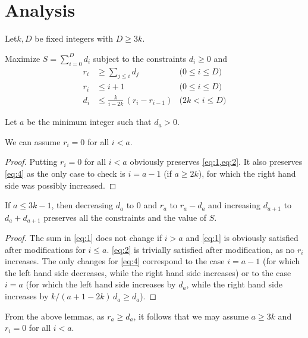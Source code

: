 \section{Analysis}

Let$k,D$ be fixed integers with $D\ge 3k$.

\begin{problem}
Maximize $S=\sum_{i=0}^D d_i$ subject to the constraints $d_i\ge 0$ and 
\begin{align}
	r_i &\ge \sum_{j\le i} d_j&\text{($0\le i\le D$)}\label{eq:1}\\
	r_i &\le	i+1&\text{($0\le i\le D$)}\label{eq:2}\\
	d_{i}&\leq \frac{k}{i-2k}\,(r_{i}-r_{i-1})&\text{($2k< i\le D$)}\label{eq:4}
\end{align}
\end{problem}

Let $a$ be the minimum integer such that $d_a>0$.

\begin{lemma}
	We can assume $r_i=0$ for all $i<a$.
\end{lemma}
\begin{proof}
	Putting $r_i=0$ for all $i<a$ obviously preserves \cref{eq:1,eq:2}. It also preserves \cref{eq:4} as the only case 
	to check is $i=a-1$ (if $a\ge 2k$), for which the right hand side was possibly increased.
\end{proof}

\begin{lemma}
	If $a\le 3k-1$, then decreasing $d_a$ to $0$ and $r_a$ to $r_a-d_a$ and increasing $d_{a+1}$ to $d_a+d_{a+1}$ preserves  all the constraints and the value of $S$.
\end{lemma}
\begin{proof}
	The sum in \cref{eq:1} does not change if $i>a$ and \cref{eq:1} is obviously satisfied after modifications for $i\le a$.
	\cref{eq:2} is trivially satisfied after modification, as no $r_i$ increases.
	The only changes for \cref{eq:4} correspond to the case $i=a-1$ (for which the left hand side decreases,  while the right hand side increases) or to the case $i=a$ (for which the left hand side increases by $d_a$,  while the right hand side increases by $k/(a+1-2k)\,d_a\ge d_a$).
\end{proof}

From the above lemmas, as $r_a\geq d_a$, it follows that we may assume $a\ge 3k$ and $r_i=0$ for all $i<a$.

